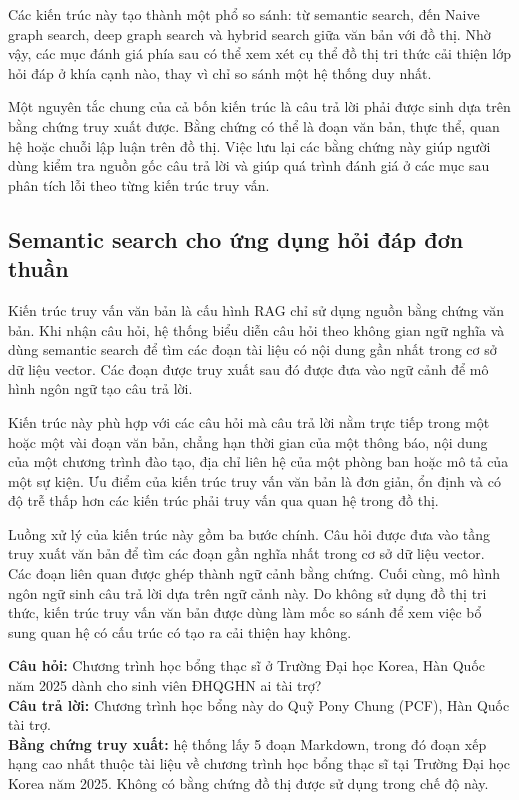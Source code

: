 Các kiến trúc này tạo thành một phổ so sánh: từ semantic search, đến Naive graph search, deep graph search và hybrid search giữa văn bản với đồ thị. Nhờ vậy, các mục đánh giá phía sau có thể xem xét cụ thể đồ thị tri thức cải thiện lớp hỏi đáp ở khía cạnh nào, thay vì chỉ so sánh một hệ thống duy nhất.

Một nguyên tắc chung của cả bốn kiến trúc là câu trả lời phải được sinh dựa trên bằng chứng truy xuất được. Bằng chứng có thể là đoạn văn bản, thực thể, quan hệ hoặc chuỗi lập luận trên đồ thị. Việc lưu lại các bằng chứng này giúp người dùng kiểm tra nguồn gốc câu trả lời và giúp quá trình đánh giá ở các mục sau phân tích lỗi theo từng kiến trúc truy vấn.

\subsection{Semantic search cho ứng dụng hỏi đáp đơn thuần}

Kiến trúc truy vấn văn bản là cấu hình RAG chỉ sử dụng nguồn bằng chứng văn bản. Khi nhận câu hỏi, hệ thống biểu diễn câu hỏi theo không gian ngữ nghĩa và dùng semantic search để tìm các đoạn tài liệu có nội dung gần nhất trong cơ sở dữ liệu vector. Các đoạn được truy xuất sau đó được đưa vào ngữ cảnh để mô hình ngôn ngữ tạo câu trả lời.

Kiến trúc này phù hợp với các câu hỏi mà câu trả lời nằm trực tiếp trong một hoặc một vài đoạn văn bản, chẳng hạn thời gian của một thông báo, nội dung của một chương trình đào tạo, địa chỉ liên hệ của một phòng ban hoặc mô tả của một sự kiện. Ưu điểm của kiến trúc truy vấn văn bản là đơn giản, ổn định và có độ trễ thấp hơn các kiến trúc phải truy vấn qua quan hệ trong đồ thị.

Luồng xử lý của kiến trúc này gồm ba bước chính. Câu hỏi được đưa vào tầng truy xuất văn bản để tìm các đoạn gần nghĩa nhất trong cơ sở dữ liệu vector. Các đoạn liên quan được ghép thành ngữ cảnh bằng chứng. Cuối cùng, mô hình ngôn ngữ sinh câu trả lời dựa trên ngữ cảnh này. Do không sử dụng đồ thị tri thức, kiến trúc truy vấn văn bản được dùng làm mốc so sánh để xem việc bổ sung quan hệ có cấu trúc có tạo ra cải thiện hay không.

\begin{tcolorbox}[
    enhanced,
    breakable,
    title={Ví dụ minh họa -- Semantic search},
    fonttitle=\bfseries,
    colback=blue!2,
    colframe=darkblue!70,
    boxrule=0.5pt,
    arc=1.5mm,
    left=6pt,
    right=6pt,
    top=5pt,
    bottom=5pt
]
\small
\textbf{Câu hỏi:} Chương trình học bổng thạc sĩ ở Trường Đại học Korea, Hàn Quốc năm 2025 dành cho sinh viên ĐHQGHN ai tài trợ?\\
\textbf{Câu trả lời:} Chương trình học bổng này do Quỹ Pony Chung (PCF), Hàn Quốc tài trợ.\\
\textbf{Bằng chứng truy xuất:} hệ thống lấy 5 đoạn Markdown, trong đó đoạn xếp hạng cao nhất thuộc tài liệu về chương trình học bổng thạc sĩ tại Trường Đại học Korea năm 2025. Không có bằng chứng đồ thị được sử dụng trong chế độ này.\\
\end{tcolorbox}


